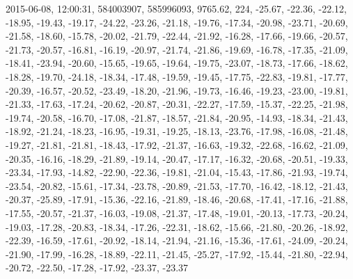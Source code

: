 2015-06-08, 12:00:31, 584003907, 585996093, 9765.62, 224, -25.67, -22.36, -22.12, -18.95, -19.43, -19.17, -24.22, -23.26, -21.18, -19.76, -17.34, -20.98, -23.71, -20.69, -21.58, -18.60, -15.78, -20.02, -21.79, -22.44, -21.92, -16.28, -17.66, -19.66, -20.57, -21.73, -20.57, -16.81, -16.19, -20.97, -21.74, -21.86, -19.69, -16.78, -17.35, -21.09, -18.41, -23.94, -20.60, -15.65, -19.65, -19.64, -19.75, -23.07, -18.73, -17.66, -18.62, -18.28, -19.70, -24.18, -18.34, -17.48, -19.59, -19.45, -17.75, -22.83, -19.81, -17.77, -20.39, -16.57, -20.52, -23.49, -18.20, -21.96, -19.73, -16.46, -19.23, -23.00, -19.81, -21.33, -17.63, -17.24, -20.62, -20.87, -20.31, -22.27, -17.59, -15.37, -22.25, -21.98, -19.74, -20.58, -16.70, -17.08, -21.87, -18.57, -21.84, -20.95, -14.93, -18.34, -21.43, -18.92, -21.24, -18.23, -16.95, -19.31, -19.25, -18.13, -23.76, -17.98, -16.08, -21.48, -19.27, -21.81, -21.81, -18.43, -17.92, -21.37, -16.63, -19.32, -22.68, -16.62, -21.09, -20.35, -16.16, -18.29, -21.89, -19.14, -20.47, -17.17, -16.32, -20.68, -20.51, -19.33, -23.34, -17.93, -14.82, -22.90, -22.36, -19.81, -21.04, -15.43, -17.86, -21.93, -19.74, -23.54, -20.82, -15.61, -17.34, -23.78, -20.89, -21.53, -17.70, -16.42, -18.12, -21.43, -20.37, -25.89, -17.91, -15.36, -22.16, -21.89, -18.46, -20.68, -17.41, -17.16, -21.88, -17.55, -20.57, -21.37, -16.03, -19.08, -21.37, -17.48, -19.01, -20.13, -17.73, -20.24, -19.03, -17.28, -20.83, -18.34, -17.26, -22.31, -18.62, -15.66, -21.80, -20.26, -18.92, -22.39, -16.59, -17.61, -20.92, -18.14, -21.94, -21.16, -15.36, -17.61, -24.09, -20.24, -21.90, -17.99, -16.28, -18.89, -22.11, -21.45, -25.27, -17.92, -15.44, -21.80, -22.94, -20.72, -22.50, -17.28, -17.92, -23.37, -23.37

